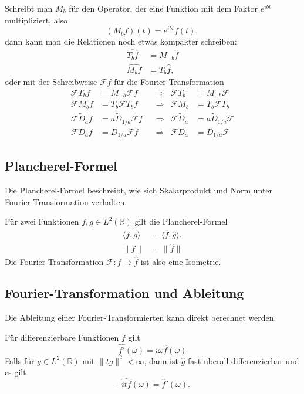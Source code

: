 Schreibt man $M_b$ für den Operator, der eine Funktion mit dem
Faktor $e^{ibt}$ multipliziert, also
\[
(M_bf)(t) = e^{ibt}f(t),
\]
dann kann man die Relationen noch etwas kompakter schreiben:
\begin{align*}
\widehat{T_bf}
&=
M_{-b}\hat{f}
\\
\widehat{M_bf}
&=
T_b\hat{f},
\end{align*}
oder mit der Schreibweise $\mathcal{F}f$ für die Fourier-Transformation
\[
\begin{aligned}
\mathcal{F}T_b f &= M_{-b}\mathcal F f
&&\Rightarrow &
\mathcal{F}T_b &= M_{-b}\mathcal{F}
\\
\mathcal{F}M_b f&=T_b\mathcal{F}T_bf
&&\Rightarrow &
\mathcal{F}M_b&=T_b\mathcal{F}T_b
\\
\mathcal{F}\tilde{D}_af&=a \tilde{D}_{1/a} \mathcal F f
&&\Rightarrow &
\mathcal{F}\tilde{D}_a&=a \tilde{D}_{1/a} \mathcal F 
\\
\mathcal{F}D_af&=D_{1/a} \mathcal F f
&&\Rightarrow &
\mathcal{F}D_a&= D_{1/a} \mathcal F 
\end{aligned}
\]

\subsection{Plancherel-Formel}
Die Plancherel-Formel beschreibt, wie sich Skalarprodukt und Norm
unter Fourier-Transformation verhalten.

\begin{satz}
Für zwei Funktionen $f,g\in L^2(\mathbb R)$ gilt die Plancherel-Formel
\begin{align*}
\langle f,g\rangle
&=
\langle \hat{f},\hat{g}\rangle.
\\
\|f\|&=\|\hat{f}\|
\end{align*}
Die Fourier-Transformation $\mathcal{F}\colon f\mapsto \hat{f}$ ist
also eine Isometrie.
\end{satz}

\subsection{Fourier-Transformation und Ableitung
\label{subsection:ft-ableitung}}
Die Ableitung einer Fourier-Transformierten kann direkt berechnet werden.

\begin{satz}
Für differenzierbare Funktionen $f$ gilt
\[
\widehat{f'}(\omega) = i\omega \hat{f}(\omega)
\]
Falls für $g\in L^2(\mathbb R)$ mit $\|tg\|^2<\infty$, dann ist $\hat{g}$
fast überall differenzierbar und es gilt
\[
-\widehat{i t f}(\omega) = \hat{f}'(\omega).
\]
\end{satz}

